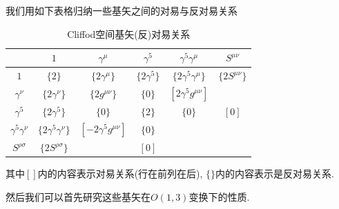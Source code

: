 我们用如下表格归纳一些基矢之间的对易与反对易关系
\begin{table}[!htbp]
    \centering
    \begin{tabular}{c|ccccc}
                             & $1$                   & $\gamma^\mu$          & $\gamma^5$         & $\gamma^5\gamma^\mu$ & $S^{\mu\nu}$\\
        \hline
        $1$                  & $\{2\}$                   & $\{2\gamma^\mu\}$ & $\{2\gamma^5\}$     & $\{2\gamma^5\gamma^\mu\}$ & $\{2S^{\mu\nu}\}$ \\
        $\gamma^\nu$         & $\{2\gamma^\nu\}$         & $\{2g^{\mu\nu}\}$ & $\{0\}$             & $[2\gamma^5g^{\mu\nu}]$    &                   \\
        $\gamma^5$           & $\{2\gamma^5\}$           & $\{0\}$           & $\{2\}$            &  $\{0\}$                     &  $[0]$    \\
        $\gamma^5\gamma^\nu$ & $\{2\gamma^5\gamma^\nu\}$ &  $[-2\gamma^5g^{\mu\nu}]$            & $\{0\}$            &                              &               \\
        $S^{\rho\sigma}$     & $\{2S^{\rho\sigma}\}$     &                  &    $[0]$               &                           & %
    \end{tabular}
    \caption{Cliffod空间基矢(反)对易关系}
\end{table}
其中$[]$内的内容表示对易关系(行在前列在后), $\{\}$内的内容表示是反对易关系.

然后我们可以首先研究这些基矢在$O(1, 3)$变换下的性质.


